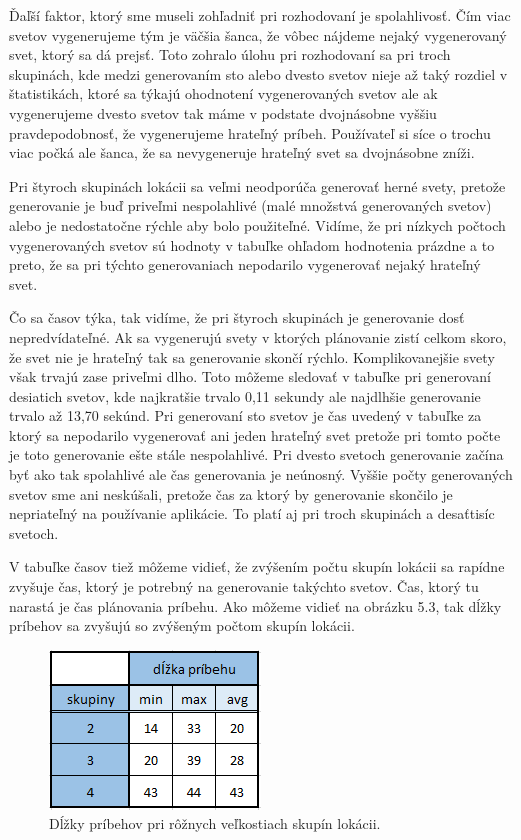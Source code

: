Ďaľší faktor, ktorý sme museli zohľadniť pri rozhodovaní je spolahlivosť. Čím viac svetov vygenerujeme tým je väčšia šanca, že vôbec nájdeme nejaký vygenerovaný svet, ktorý sa dá prejsť. Toto zohralo úlohu pri rozhodovaní sa pri troch skupinách, kde medzi generovaním sto alebo dvesto svetov nieje až taký rozdiel v štatistikách, ktoré sa týkajú ohodnotení vygenerovaných svetov ale ak vygenerujeme dvesto svetov tak máme v podstate dvojnásobne vyššiu pravdepodobnosť, že vygenerujeme hrateľný príbeh. Používateľ si síce o trochu viac počká ale šanca, že sa nevygeneruje hrateľný svet sa dvojnásobne zníži.\par
Pri štyroch skupinách lokácii sa veľmi neodporúča generovať herné svety, pretože generovanie je buď priveľmi nespolahlivé (malé množstvá generovaných svetov) alebo je nedostatočne rýchle aby bolo použiteľné. Vidíme, že pri nízkych počtoch vygenerovaných svetov sú hodnoty v tabuľke ohľadom hodnotenia prázdne a to preto, že sa pri týchto generovaniach nepodarilo vygenerovať nejaký hrateľný svet.\par
Čo sa časov týka, tak vidíme, že pri štyroch skupinách je generovanie dosť nepredvídateľné. Ak sa vygenerujú svety v ktorých plánovanie zistí celkom skoro, že svet nie je hrateľný tak sa generovanie skončí rýchlo. Komplikovanejšie svety však trvajú zase priveľmi dlho. Toto môžeme sledovať v tabuľke pri generovaní desiatich svetov, kde najkratšie trvalo 0,11 sekundy ale najdlhšie generovanie trvalo až 13,70 sekúnd. Pri generovaní sto svetov je čas uvedený v tabuľke za ktorý sa nepodarilo vygenerovať ani jeden hrateľný svet pretože pri tomto počte je toto generovanie ešte stále nespolahlivé. Pri dvesto svetoch generovanie začína byť ako tak spolahlivé ale čas generovania je neúnosný. Vyššie počty generovaných svetov sme ani neskúšali, pretože čas za ktorý by generovanie skončilo je nepriateľný na používanie aplikácie. To platí aj pri troch skupinách a desaťtisíc svetoch.\par
V tabuľke časov tiež môžeme vidieť, že zvýšením počtu skupín lokácii sa rapídne zvyšuje čas, ktorý je potrebný na generovanie takýchto svetov. Čas, ktorý tu narastá je čas plánovania príbehu. Ako môžeme vidieť na obrázku 5.3, tak dĺžky príbehov sa zvyšujú so zvýšeným počtom skupín lokácii.
\begin{figure}[H] 
\begin{center}
\includegraphics[scale=1.0]{img/dlzky.png}
\caption{Dĺžky príbehov pri rôžnych veľkostiach skupín lokácii.}
\label{fig:ch53}
\end{center}
\end{figure}

